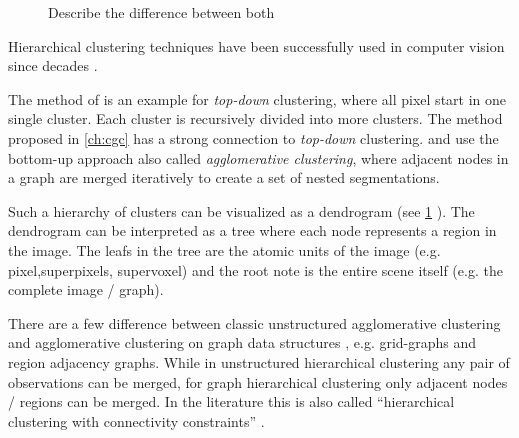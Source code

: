 \begin{figure}
{{
        }
    }
    \caption[Bottom-up vs. top-down hierarchical clustering]{
        Describe the difference between both
    }
    \label{fig:hc_bottom_up_top_down}
\end{figure}


Hierarchical clustering techniques have been successfully used
in computer vision since decades \citep{ohlander_1978_cgip,forsyth_2002_book,arbelaez_2006_cvpr,iglesias_2013,morel_1995_book}.

The method  of \citet{ohlander_1978_cgip} is an example for \emph{top-down} clustering,
where all pixel start in one single cluster. Each cluster is recursively divided 
into  more clusters. The method proposed in \cref{ch:cgc} has a strong connection to
\emph{top-down} clustering.
\citet{arbelaez_2006_cvpr} and \citet{iglesias_2013} use the bottom-up approach 
also called \emph{agglomerative clustering}, where 
adjacent nodes in a graph are merged iteratively to create 
a set of nested segmentations.


Such a hierarchy of clusters can be visualized as a dendrogram (see \cref{fig:hc_bottom_up_top_down} ).
The dendrogram can be interpreted as a tree where each node represents a
region in the image.
The leafs in the tree are the atomic units of the image (e.g. pixel,superpixels, supervoxel)
and the root note is the entire scene itself (e.g. the complete image / graph).

There are a few difference between classic unstructured agglomerative clustering
\citep{florek_1951,sokal_1958_science_bulletin,ward_63_jasa}
and agglomerative clustering on graph data structures \citep{arbelaez_2006_cvpr,iglesias_2013,morel_1995_book}, 
e.g. grid-graphs and region adjacency graphs\citep{vlachos_1993_csv}.
While in unstructured hierarchical clustering any pair of observations can be merged,
for graph hierarchical clustering only adjacent nodes / regions can be merged.
In the literature this is also called ``hierarchical clustering with connectivity constraints'' \cite{scikit_learn}.


